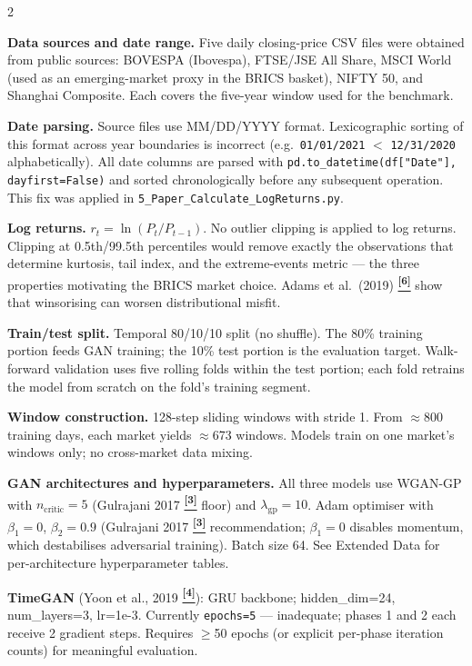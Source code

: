 \documentclass[10pt]{article}
\newcommand{\tcite}[1]{%
  \hyperlink{R:#1}{\textsuperscript{\scriptsize\textbf{[#1]}}}}
\begin{document}
\begin{multicols}{2}
\small

\textbf{Data sources and date range.}
Five daily closing-price CSV files were obtained from public sources: BOVESPA (Ibovespa), FTSE/JSE All Share, MSCI World (used as an emerging-market proxy in the BRICS basket), NIFTY 50, and Shanghai Composite. Each covers the five-year window used for the benchmark.

\textbf{Date parsing.}
Source files use MM/DD/YYYY format. Lexicographic sorting of this format across year boundaries is incorrect (e.g.\ \texttt{01/01/2021} $<$ \texttt{12/31/2020} alphabetically). All date columns are parsed with \texttt{pd.to\_datetime(df["Date"], dayfirst=False)} and sorted chronologically before any subsequent operation. This fix was applied in \texttt{5\_Paper\_Calculate\_LogReturns.py}.

\textbf{Log returns.}
$r_t = \ln(P_t / P_{t-1})$. No outlier clipping is applied to log returns. Clipping at 0.5th/99.5th percentiles would remove exactly the observations that determine kurtosis, tail index, and the extreme-events metric --- the three properties motivating the BRICS market choice. Adams et al.\ (2019)\tcite{6} show that winsorising can worsen distributional misfit.

\textbf{Train/test split.}
Temporal 80/10/10 split (no shuffle). The 80\% training portion feeds GAN training; the 10\% test portion is the evaluation target. Walk-forward validation uses five rolling folds within the test portion; each fold retrains the model from scratch on the fold's training segment.

\textbf{Window construction.}
128-step sliding windows with stride 1. From $\approx$800 training days, each market yields $\approx$673 windows. Models train on one market's windows only; no cross-market data mixing.

\textbf{GAN architectures and hyperparameters.}
All three models use WGAN-GP with $n_\text{critic}=5$ (Gulrajani 2017\tcite{3} floor) and $\lambda_\text{gp}=10$. Adam optimiser with $\beta_1=0$, $\beta_2=0.9$ (Gulrajani 2017\tcite{3} recommendation; $\beta_1=0$ disables momentum, which destabilises adversarial training). Batch size 64. See Extended Data for per-architecture hyperparameter tables.

\textbf{TimeGAN} (Yoon et al., 2019\tcite{4}): GRU backbone; hidden\_dim=24, num\_layers=3, lr=1e-3. Currently \texttt{epochs=5} --- inadequate; phases 1 and 2 each receive 2 gradient steps. Requires $\geq$50 epochs (or explicit per-phase iteration counts) for meaningful evaluation.


\end{multicols}
\end{document}
